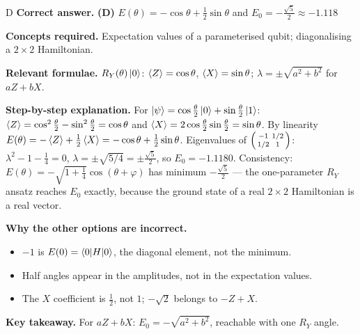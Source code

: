 \documentclass[11pt,a4paper]{article}
\newcommand{\qsep}{\par\vspace{2pt}{\color{black!15}\hrule}\vspace{4pt}}
\begin{document}
\begin{solbox}{D}
\textbf{\color{brand}Correct answer.} \textcolor{okgreen}{\textbf{(D)}} $E(\theta) = -\cos\theta + \tfrac12\sin\theta$ and $E_0 = -\tfrac{\sqrt5}{2} \approx -1.118$

\textbf{\color{brand}Concepts required.} Expectation values of a parameterised qubit; diagonalising a $2\times2$ Hamiltonian.

\textbf{\color{brand}Relevant formulae.} $R_Y(\theta)\ket0$: $\braket Z = \cos\theta$, $\braket X = \sin\theta$; $\lambda = \pm\sqrt{a^2 + b^2}$ for $aZ + bX$.

\textbf{\color{brand}Step-by-step explanation.} For $\ket\psi = \cos\frac\theta2\ket0 + \sin\frac\theta2\ket1$: $\braket Z = \cos^2\frac\theta2 - \sin^2\frac\theta2 = \cos\theta$ and
$\braket X = 2\cos\frac\theta2\sin\frac\theta2 = \sin\theta$. By linearity $E(\theta) = -\braket Z + \tfrac12\braket X = -\cos\theta + \tfrac12\sin\theta$.
Eigenvalues of $\begin{psmallmatrix}-1&1/2\\1/2&1\end{psmallmatrix}$: $\lambda^2 - 1 - \tfrac14 = 0$, $\lambda = \pm\sqrt{5/4} = \pm\frac{\sqrt5}{2}$, so $E_0 = -1.1180$.
Consistency: $E(\theta) = -\sqrt{1 + \tfrac14}\cos(\theta + \varphi)$ has minimum $-\frac{\sqrt5}{2}$ --- the one-parameter $R_Y$ ansatz reaches $E_0$ exactly,
because the ground state of a real $2\times2$ Hamiltonian is a real vector.

\textbf{\color{brand}Why the other options are incorrect.}
\begin{itemize}[leftmargin=2.4em, itemsep=1pt, topsep=2pt]
\item[\textbf{(A)}] $-1$ is $E(0) = \braket{0|H|0}$, the diagonal element, not the minimum.
\item[\textbf{(B)}] Half angles appear in the amplitudes, not in the expectation values.
\item[\textbf{(C)}] The $X$ coefficient is $\frac12$, not $1$; $-\sqrt2$ belongs to $-Z + X$.
\end{itemize}
\textbf{\color{brand}Key takeaway.} For $aZ + bX$: $E_0 = -\sqrt{a^2 + b^2}$, reachable with one $R_Y$ angle.
\end{solbox}
\qsep
\end{document}
